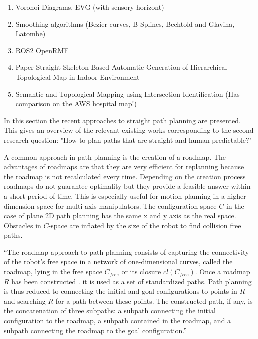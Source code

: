 \begin{enumerate}
    \item Voronoi Diagrams, EVG (with sensory horizont)
    \item Smoothing algorithms (Bezier curves, B-Splines, Bechtold and Glavina, Latombe)
    \item ROS2 OpenRMF
    \item Paper Straight Skeleton Based Automatic Generation of Hierarchical Topological Map in Indoor Environment
    \item Semantic and Topological Mapping using Intersection Identification (Has comparison on the AWS hospital map!)
\end{enumerate}

In this section the recent approaches to straight path planning are presented. This gives an overview of the relevant existing works corresponding to the second research question: "How to plan paths that are straight and human-predictable?"

A common approach in path planning is the creation of a roadmap. The advantages of roadmaps are that they are very efficient for replanning because the roadmap is not recalculated every time. Depending on the creation process roadmaps do not guarantee optimality but they provide a feasible answer within a short period of time. This is especially useful for motion planning in a higher dimension space for multi axis manipulators. The configuration space \(C\) in the case of plane 2D path planning has the same x and y axis as the real space. Obstacles in \(C\)-space are inflated by the size of the robot to find collision free paths.

\begin{displayquote}
    \enquote{The roadmap approach to path planning consists of capturing the connectivity of the robot's free space in a network of one-dimensional curves, called the roadmap, lying in the free space \(C_{free}\) or its closure \(cl(C_{free})\). Once a roadmap \(R\) has been constructed . it is used as a set of standardized paths. Path planning is thus reduced to connecting the initial and goal configurations to points in \(R\) and searching \(R\) for a path between these points. The constructed path, if any, is the concatenation of three subpaths: a subpath connecting the initial configuration to the roadmap, a subpath contained in the roadmap, and a subpath connecting the roadmap to the goal configuration.} \cite{latombe_robot_2003}
\end{displayquote}

